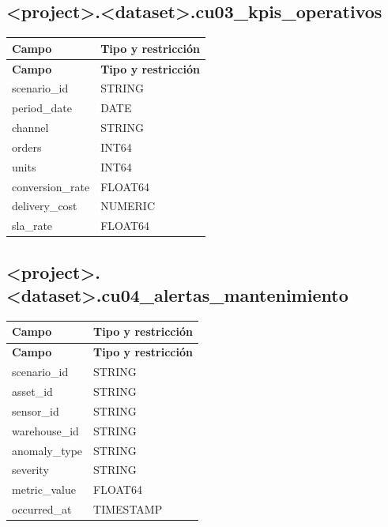 \documentclass[11pt]{article}
\begin{document}
\subsection{<project>.<dataset>.cu03\_\allowbreak{}kpis\_\allowbreak{}operativos}

\begingroup\small
\begin{longtable}{@{}>{\raggedright\arraybackslash}p{}>{\raggedright\arraybackslash}p{}@{}}
\toprule
\textbf{Campo} & \textbf{Tipo y restricción} \\
\midrule
\endfirsthead
\toprule
\textbf{Campo} & \textbf{Tipo y restricción} \\
\midrule
\endhead
scenario\_\allowbreak{}id & STRING \\
period\_\allowbreak{}date & DATE \\
channel & STRING \\
orders & INT64 \\
units & INT64 \\
conversion\_\allowbreak{}rate & FLOAT64 \\
delivery\_\allowbreak{}cost & NUMERIC \\
sla\_\allowbreak{}rate & FLOAT64 \\
\bottomrule
\end{longtable}
\endgroup

\subsection{<project>.<dataset>.cu04\_\allowbreak{}alertas\_\allowbreak{}mantenimiento}

\begingroup\small
\begin{longtable}{@{}>{\raggedright\arraybackslash}p{}>{\raggedright\arraybackslash}p{}@{}}
\toprule
\textbf{Campo} & \textbf{Tipo y restricción} \\
\midrule
\endfirsthead
\toprule
\textbf{Campo} & \textbf{Tipo y restricción} \\
\midrule
\endhead
scenario\_\allowbreak{}id & STRING \\
asset\_\allowbreak{}id & STRING \\
sensor\_\allowbreak{}id & STRING \\
warehouse\_\allowbreak{}id & STRING \\
anomaly\_\allowbreak{}type & STRING \\
severity & STRING \\
metric\_\allowbreak{}value & FLOAT64 \\
occurred\_\allowbreak{}at & TIMESTAMP \\
\bottomrule
\end{longtable}
\endgroup
\end{document}
